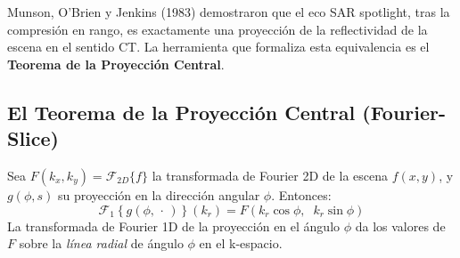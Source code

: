 \documentclass[12pt,a4paper,oneside]{book}
\newcommand{\defin}[2]{%
  \begin{tcolorbox}[enhanced, breakable,
    colback=blue!5, colframe=blue!50!black,
    fonttitle=\bfseries,
    title={\protect#1}]
    #2
  \end{tcolorbox}}
\begin{document}
Munson, O'Brien y Jenkins (1983) demostraron que el eco SAR spotlight, tras la compresión en rango, es exactamente una proyección de la reflectividad de la escena en el sentido CT. La herramienta que formaliza esta equivalencia es el \textbf{Teorema de la Proyección Central}.

\subsection{El Teorema de la Proyección Central (Fourier-Slice)}

\defin{Teorema de la Proyección Central}{
Sea $F(k_x,k_y)=\mathcal{F}_{2D}\{f\}$ la transformada de Fourier 2D de la escena $f(x,y)$, y $g(\phi,s)$ su proyección en la dirección angular $\phi$. Entonces:
\[
\mathcal{F}_1\!\left\{g(\phi,\,\cdot\,)\right\}(k_r)
  = F\!\left(k_r\cos\phi,\;\;k_r\sin\phi\right)
\]
La transformada de Fourier 1D de la proyección en el ángulo $\phi$ da los valores de $F$ sobre la \emph{línea radial} de ángulo $\phi$ en el k-espacio.
}
\end{document}
